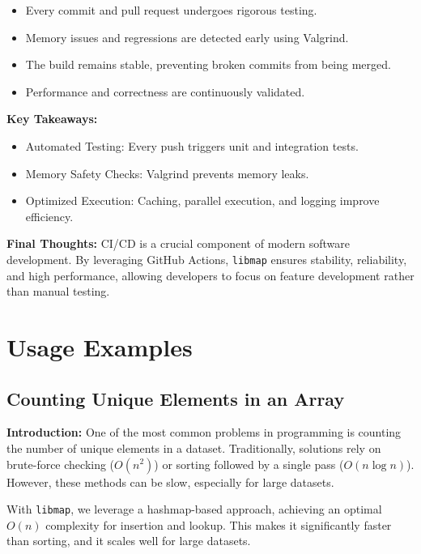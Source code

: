 \documentclass[titlepage]{article}
\begin{document}
\begin{itemize}
    \item Every commit and pull request undergoes rigorous testing.
    \item Memory issues and regressions are detected early using Valgrind.
    \item The build remains stable, preventing broken commits from being merged.
    \item Performance and correctness are continuously validated.
\end{itemize}

\textbf{Key Takeaways:}
\begin{itemize}
    \item Automated Testing: Every push triggers unit and integration tests.
    \item Memory Safety Checks: Valgrind prevents memory leaks.
    \item Optimized Execution: Caching, parallel execution, and logging improve efficiency.
\end{itemize}

\textbf{Final Thoughts:}  
CI/CD is a crucial component of modern software development. By leveraging GitHub Actions, \texttt{libmap} ensures stability, reliability, and high performance, allowing developers to focus on feature development rather than manual testing.



\newpage

\section{Usage Examples}

\subsection{Counting Unique Elements in an Array}

\textbf{Introduction:}
One of the most common problems in programming is counting the number of unique elements in a dataset.
Traditionally, solutions rely on brute-force checking (\( O(n^2) \)) or sorting followed by a single pass (\( O(n \log n) \)).
However, these methods can be slow, especially for large datasets.

With \texttt{libmap}, we leverage a hashmap-based approach, achieving an optimal $O(n)$ complexity for insertion and lookup.
This makes it significantly faster than sorting, and it scales well for large datasets.
\end{document}
